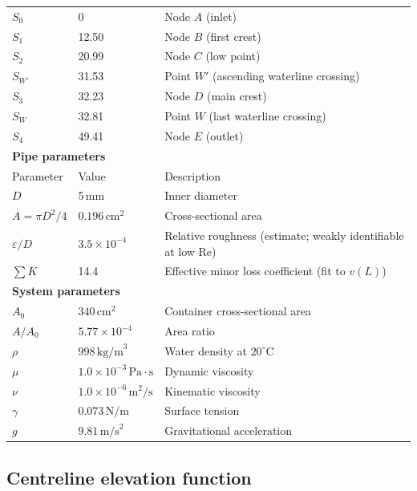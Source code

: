 \documentclass[11pt]{article}
\begin{document}
\begin{table}[H]
\begin{tabular}{llll}
\midrule
$S_0$ & 0 & \multicolumn{2}{l}{Node $A$ (inlet)} \\
$S_1$ & 12.50 & \multicolumn{2}{l}{Node $B$ (first crest)} \\
$S_2$ & 20.99 & \multicolumn{2}{l}{Node $C$ (low point)} \\
$S_{W'}$ & 31.53 & \multicolumn{2}{l}{Point $W'$ (ascending waterline crossing)} \\
$S_3$ & 32.23 & \multicolumn{2}{l}{Node $D$ (main crest)} \\
$S_W$ & 32.81 & \multicolumn{2}{l}{Point $W$ (last waterline crossing)} \\
$S_4$ & 49.41 & \multicolumn{2}{l}{Node $E$ (outlet)} \\
\midrule
\multicolumn{4}{l}{\textbf{Pipe parameters}} \\
\midrule
Parameter & Value & \multicolumn{2}{l}{Description} \\
\midrule
$D$ & 5\,mm & \multicolumn{2}{l}{Inner diameter} \\
$A = \pi D^2/4$ & $0.196\,\text{cm}^2$ & \multicolumn{2}{l}{Cross-sectional area} \\
$\varepsilon/D$ & $3.5\times 10^{-4}$ & \multicolumn{2}{l}{Relative roughness (estimate; weakly identifiable at low Re)} \\
$\sum K$ & 14.4 & \multicolumn{2}{l}{Effective minor loss coefficient (fit to $v(L)$)} \\
\midrule
\multicolumn{4}{l}{\textbf{System parameters}} \\
\midrule
$A_0$ & $340\,\text{cm}^2$ & \multicolumn{2}{l}{Container cross-sectional area} \\
$A/A_0$ & $5.77\times 10^{-4}$ & \multicolumn{2}{l}{Area ratio} \\
$\rho$ & $998\,\text{kg/m}^3$ & \multicolumn{2}{l}{Water density at $20^\circ$C} \\
$\mu$ & $1.0 \times 10^{-3}\,\text{Pa}\cdot\text{s}$ & \multicolumn{2}{l}{Dynamic viscosity} \\
$\nu$ & $1.0 \times 10^{-6}\,\text{m}^2/\text{s}$ & \multicolumn{2}{l}{Kinematic viscosity} \\
$\gamma$ & $0.073\,\text{N/m}$ & \multicolumn{2}{l}{Surface tension} \\
$g$ & $9.81\,\text{m/s}^2$ & \multicolumn{2}{l}{Gravitational acceleration} \\
\bottomrule
\end{tabular}
\end{table}

\subsection{Centreline elevation function}
\end{document}
